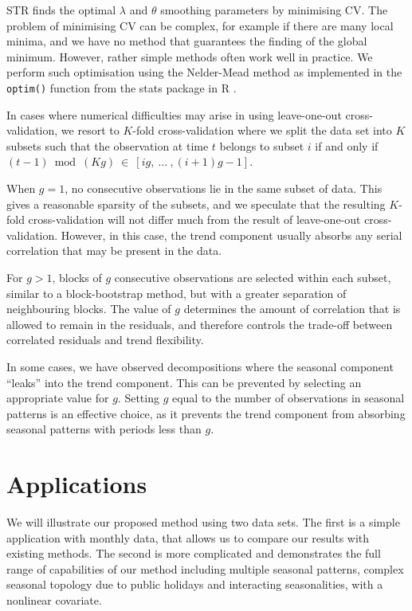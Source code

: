 \documentclass[11pt,a4paper,]{article}
\begin{document}
STR finds the optimal \(\lambda\) and \(\theta\) smoothing parameters by minimising CV. The problem of minimising CV can be complex, for example if there are many local minima, and we have no method that guarantees the finding of the global minimum. However, rather simple methods often work well in practice. We perform such optimisation using the Nelder-Mead method as implemented in the \texttt{optim()} function from the stats package in R \autocite{R}.

In cases where numerical difficulties may arise in using leave-one-out cross-validation, we resort to \(K\)-fold cross-validation where we split the data set into \(K\) subsets such that the observation at time \(t\) belongs to subset \(i\) if and only if \((t-1) \ \operatorname{mod}\ (K g) \ \in \ [i g, \ \dots \ , (i+1)g-1]\).

When \(g = 1\), no consecutive observations lie in the same subset of data. This gives a reasonable sparsity of the subsets, and we speculate that the resulting \(K\)-fold cross-validation will not differ much from the result of leave-one-out cross-validation. However, in this case, the trend component usually absorbs any serial correlation that may be present in the data.

For \(g>1\), blocks of \(g\) consecutive observations are selected within each subset, similar to a block-bootstrap method, but with a greater separation of neighbouring blocks. The value of \(g\) determines the amount of correlation that is allowed to remain in the residuals, and therefore controls the trade-off between correlated residuals and trend flexibility.

In some cases, we have observed decompositions where the seasonal component ``leaks'' into the trend component. This can be prevented by selecting an appropriate value for \(g\). Setting \(g\) equal to the number of observations in seasonal patterns is an effective choice, as it prevents the trend component from absorbing seasonal patterns with periods less than \(g\).

\hypertarget{applications}{%
\section{Applications}\label{applications}}

We will illustrate our proposed method using two data sets. The first is a simple application with monthly data, that allows us to compare our results with existing methods. The second is more complicated and demonstrates the full range of capabilities of our method including multiple seasonal patterns, complex seasonal topology due to public holidays and interacting seasonalities, with a nonlinear covariate.
\end{document}
